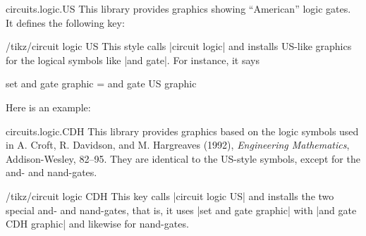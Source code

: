 \begin{tikzlibrary}{circuits.logic.US}
    This library provides graphics showing ``American'' logic gates. It defines
    the following key:

    \begin{key}{/tikz/circuit logic US}
        This style calls |circuit logic| and installs US-like graphics for the
        logical symbols like |and gate|. For instance, it says
\begin{codeexample}
set and gate graphic = and gate US graphic
\end{codeexample}

        Here is an example:
\begin{codeexample}[preamble={\usetikzlibrary{circuits.logic.CDH}}]
\end{codeexample}
    \end{key}
\end{tikzlibrary}

\begin{tikzlibrary}{circuits.logic.CDH}
    This library provides graphics based on the logic symbols used in A. Croft,
    R. Davidson, and M. Hargreaves (1992),  \emph{Engineering Mathematics},
    Addison-Wesley, 82--95. They are identical to the US-style symbols, except
    for the and- and nand-gates.

    \begin{key}{/tikz/circuit logic CDH}
        This key calls |circuit logic US| and installs the two special and- and
        nand-gates, that is, it uses |set and gate graphic| with
        |and gate CDH graphic| and likewise for nand-gates.
    \end{key}
\end{tikzlibrary}

